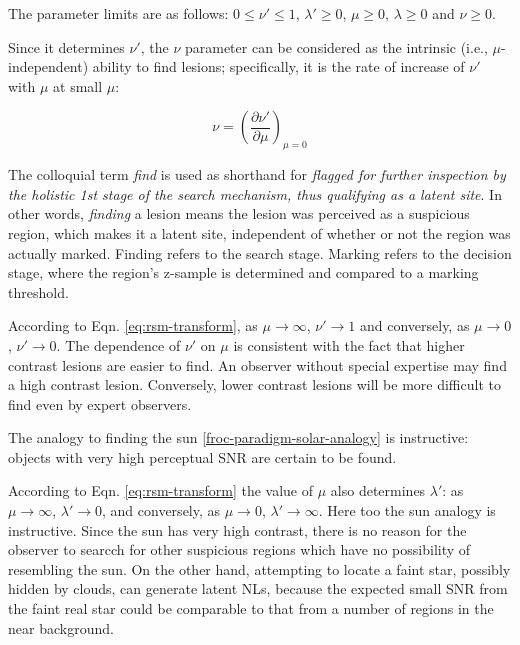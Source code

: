 \documentclass[
]{book}
\begin{document}
The parameter limits are as follows: \(0 \le \nu' \le 1\), \(\lambda' \ge 0\), \(\mu \ge 0\), \(\lambda \ge 0\) and \(\nu \ge 0\).

Since it determines \(\nu'\), the \(\nu\) parameter can be considered as the intrinsic (i.e., \(\mu\)-independent) ability to find lesions; specifically, it is the rate of increase of \(\nu'\) with \(\mu\) at small \(\mu\):

\begin{equation} 
\nu = \left (\frac{\partial \nu'}{\partial \mu}  \right )_{\mu = 0}
\label{eq:rsm-nup-limit}
\end{equation}

The colloquial term \emph{find} is used as shorthand for \emph{flagged for further inspection by the holistic 1st stage of the search mechanism, thus qualifying as a latent site}. In other words, \emph{finding} a lesion means the lesion was perceived as a suspicious region, which makes it a latent site, independent of whether or not the region was actually marked. Finding refers to the search stage. Marking refers to the decision stage, where the region's z-sample is determined and compared to a marking threshold.

According to Eqn. \eqref{eq:rsm-transform}, as \(\mu \rightarrow \infty\), \(\nu' \rightarrow 1\) and conversely, as \(\mu \rightarrow 0\), \(\nu' \rightarrow 0\). The dependence of \(\nu'\) on \(\mu\) is consistent with the fact that higher contrast lesions are easier to find. An observer without special expertise may find a high contrast lesion. Conversely, lower contrast lesions will be more difficult to find even by expert observers.

The analogy to finding the sun \ref{froc-paradigm-solar-analogy} is instructive: objects with very high perceptual SNR are certain to be found.

According to Eqn. \eqref{eq:rsm-transform} the value of \(\mu\) also determines \(\lambda'\): as \(\mu \rightarrow \infty\), \(\lambda' \rightarrow 0\), and conversely, as \(\mu \rightarrow 0\), \(\lambda' \rightarrow \infty\). Here too the sun analogy is instructive. Since the sun has very high contrast, there is no reason for the observer to searcch for other suspicious regions which have no possibility of resembling the sun. On the other hand, attempting to locate a faint star, possibly hidden by clouds, can generate latent NLs, because the expected small SNR from the faint real star could be comparable to that from a number of regions in the near background.
\end{document}
